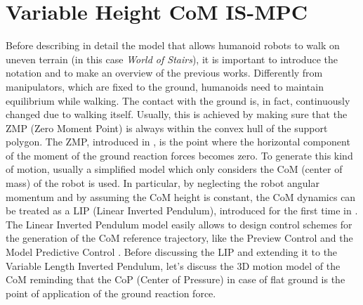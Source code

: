 \chapter{Variable Height CoM IS-MPC}
\label{ch:vh-com-is-mpc}
Before describing in detail the model \cite{SYROCO18} that allows humanoid 
robots to walk on uneven terrain (in this case \textit{World of Stairs}),
it is important to introduce the notation and 
to make an overview of the previous works.
Differently from manipulators, which are fixed to the ground, humanoids need 
to maintain equilibrium while walking. The contact with the ground is, in fact,
continuously changed due to walking itself. Usually, this is achieved by 
making sure that the ZMP (Zero Moment Point) is always within the convex hull 
of the support polygon. The ZMP, introduced in \cite{VUKOBRATOVIC19721}, is the 
point where the horizontal component of the moment of the ground reaction forces
becomes zero. To generate this kind of motion, usually a simplified model 
which only considers the CoM (center of mass) of the robot is used.
In particular, by neglecting the robot angular momentum and by assuming the 
CoM height is constant, the CoM dynamics can be treated as a LIP (Linear 
Inverted Pendulum), introduced for the first time in \cite{Kajita1991StudyOD}.
The Linear Inverted Pendulum model easily allows to design control schemes for 
the generation of the CoM reference trajectory, like the Preview Control 
\cite{Kajita2003BipedWP} and the Model Predictive Control
\cite{wieber:inria-00390462}.
Before discussing the LIP and extending it to the Variable Length Inverted
Pendulum, let's discuss the 3D motion model of the CoM reminding that the CoP
(Center of Pressure) in case of flat ground is the point of application of
the ground reaction force.

